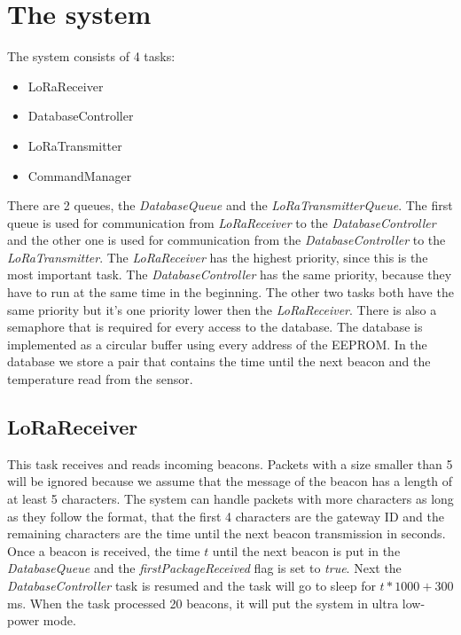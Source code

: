 \documentclass{scrartcl}
\begin{document}


\pagestyle{scrheadings}
\clearscrheadfoot

\cfoot{\pagemark}

\newpage

\section{The system}
The system consists of 4 tasks:
\begin{itemize}
    \item LoRaReceiver
    \item DatabaseController
    \item LoRaTransmitter
    \item CommandManager
\end{itemize}

There are 2 queues, the \textit{DatabaseQueue} and the \textit{LoRaTransmitterQueue}.
The first queue is used for communication from \textit{LoRaReceiver} to the \textit{DatabaseController} and the
other one is used for communication from the \textit{DatabaseController} to the \textit{LoRaTransmitter}.
The \textit{LoRaReceiver} has the highest priority, since this is the most important task.
The \textit{DatabaseController} has the same priority, because they have to run at the same time in the beginning.
The other two tasks both have the same priority but it's one priority lower then the \textit{LoRaReceiver}.
There is also a semaphore that is required for every access to the database.
The database is implemented as a circular buffer using every address of the EEPROM.
In the database we store a pair that contains the time until the next beacon and the temperature read from the sensor.

\subsection{LoRaReceiver}
This task receives and reads incoming beacons. Packets with a size smaller than 5 will be ignored because
we assume that the message of the beacon has a length of at least 5 characters. The system can handle packets with more characters
as long as they follow the format, that the first 4 characters are the gateway ID and the remaining characters are the time until the
next beacon transmission in seconds. Once a beacon is received, the time $t$ until the next beacon is put in the \textit{DatabaseQueue} and
the \textit{firstPackageReceived} flag is set to \textit{true}.
Next the \textit{DatabaseController} task is resumed and the task will go to sleep for $t*1000 + 300$ \si{\milli\second}.
When the task processed 20 beacons, it will put the system in ultra low-power mode.
\end{document}
